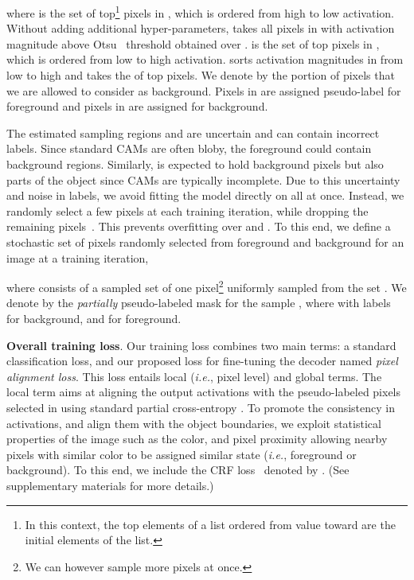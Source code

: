 \documentclass[twocolumn]{article}
\makeatletter
\theoremstyle{definition}
\newcommand*{\ie}{\emph{i.e.}\@\xspace}
\makeatother
\begin{document}
where  is the set of top\footnote{In this context, the top  elements of a list ordered from value  toward  are the initial  elements of the list.} pixels in , which is ordered from high to low activation. Without adding additional hyper-parameters,  takes all pixels in  with activation magnitude above Otsu~\cite{otsuthresh} threshold obtained over .  is the set of top  pixels in , which is ordered from low to high activation.   sorts activation magnitudes in  from low to high and takes the  of top pixels. We denote by  the portion of pixels that we are allowed to consider as background. Pixels in  are assigned pseudo-label  for foreground and pixels in  are assigned  for background.

The estimated sampling regions  and  are uncertain and can contain incorrect labels. Since standard CAMs are often bloby, the foreground  could contain background regions. Similarly,   is expected to hold background pixels but also parts of the object since CAMs are typically incomplete. Due to this uncertainty and noise in labels, we avoid fitting the model directly on  all at once. Instead, we randomly select a few pixels at each training iteration, while dropping the remaining pixels~\cite{SinghL17,srivastava2014dropout}. This prevents overfitting over  and . To this end, we define a stochastic set of pixels randomly selected from foreground and background for an image at a training iteration,

where  consists of a sampled set of one pixel\footnote{We can however sample more pixels at once.} uniformly sampled from the set .  We denote by  the \emph{partially} pseudo-labeled mask for the sample , where  with labels  for background, and  for foreground.

\noindent \textbf{Overall training loss}. Our training loss combines two main terms: a standard classification loss, and our proposed loss for fine-tuning the decoder named \emph{pixel alignment loss}. This loss entails local (\ie, pixel level) and global terms. The local term aims at aligning the output activations  with the pseudo-labeled pixels selected in  using standard partial cross-entropy .  To promote the consistency in activations, and align them with the object boundaries, we exploit statistical properties of the image such as the color, and pixel proximity allowing nearby pixels with similar color to be assigned similar state (\ie, foreground or background). To this end, we include the CRF loss~\cite{tang2018regularized} denoted by . (See supplementary materials for more details.)
\end{document}
